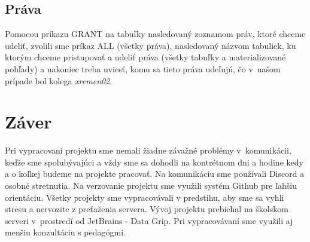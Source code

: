 \documentclass[a4paper, 11pt]{article}
\begin{document}
	\subsection{Práva}
	Pomocou príkazu GRANT na tabuľky nasledovaný zoznamom práv, ktoré chceme udeliť, zvolili sme príkaz ALL (všetky práva), nasledovaný názvom tabuliek, ku ktorým chceme pristupovať a udeliť práva (všetky tabuľky a materializované pohľady) a nakoniec treba uviesť, komu sa tieto práva udeľujú, čo v~našom prípade bol kolega \textit{xremen02}.

	\section{Záver}
	Pri vypracovaní projektu sme nemali žiadne závažné problémy v~komunikácii, keďže sme spolubývajúci a vždy sme sa dohodli na kontrétnom dni a hodine kedy a o koľkej budeme na projekte pracovať. Na komunikáciu sme používali Discord a osobné stretnutia. Na verzovanie projektu sme využili systém Github pre ľahšiu orientáciu. Všetky projekty sme vypracovávali v predstihu, aby sme sa vyhli stresu a nervozite z preťaženia servera. Vývoj projektu prebiehal na školskom serveri v~prostredí od JetBrains \-- Data Grip. Pri vypracovávaní sme využili aj menšiu konzultáciu s pedagógmi.
\end{document}
